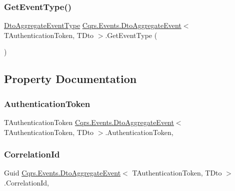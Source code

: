 \subsubsection{\texorpdfstring{Get\+Event\+Type()}{GetEventType()}}
{\footnotesize\ttfamily \hyperlink{namespaceCqrs_1_1Events_a2a32e13adeac92f5a93966cd8ee2d39a}{Dto\+Aggregate\+Event\+Type} \hyperlink{classCqrs_1_1Events_1_1DtoAggregateEvent}{Cqrs.\+Events.\+Dto\+Aggregate\+Event}$<$ T\+Authentication\+Token, T\+Dto $>$.Get\+Event\+Type (\begin{DoxyParamCaption}{ }\end{DoxyParamCaption})}



\subsection{Property Documentation}
\mbox{\label{classCqrs_1_1Events_1_1DtoAggregateEvent_a536e92af26632a9590e2ed590232cfcf}} 
\subsubsection{\texorpdfstring{Authentication\+Token}{AuthenticationToken}}
{\footnotesize\ttfamily T\+Authentication\+Token \hyperlink{classCqrs_1_1Events_1_1DtoAggregateEvent}{Cqrs.\+Events.\+Dto\+Aggregate\+Event}$<$ T\+Authentication\+Token, T\+Dto $>$.Authentication\+Token\hspace{0.3cm}{\ttfamily [get]}, {\ttfamily [set]}}

\mbox{\label{classCqrs_1_1Events_1_1DtoAggregateEvent_a0736560199765e66c50963dfa767b5a5}} 
\subsubsection{\texorpdfstring{Correlation\+Id}{CorrelationId}}
{\footnotesize\ttfamily Guid \hyperlink{classCqrs_1_1Events_1_1DtoAggregateEvent}{Cqrs.\+Events.\+Dto\+Aggregate\+Event}$<$ T\+Authentication\+Token, T\+Dto $>$.Correlation\+Id\hspace{0.3cm}{\ttfamily [get]}, {\ttfamily [set]}}

